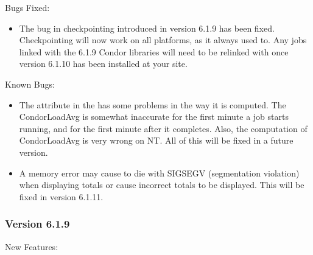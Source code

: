 \noindent Bugs Fixed:

\begin{itemize}

\item The bug in checkpointing introduced in version 6.1.9 has been
fixed.
Checkpointing will now work on all platforms, as it always used to.  
Any jobs linked with the 6.1.9 Condor libraries will need to be
relinked with  once version 6.1.10 has been installed
at your site. 

\end{itemize}

\noindent Known Bugs:

\begin{itemize}

\item The  attribute in the  has
some problems in the way it is computed.
The CondorLoadAvg is somewhat inaccurate for the first minute a job
starts running, and for the first minute after it completes.
Also, the computation of CondorLoadAvg is very wrong on NT.
All of this will be fixed in a future version.

\item A memory error may cause  to die with SIGSEGV
(segmentation violation) when displaying totals or cause incorrect
totals to be displayed.  This will be fixed in version 6.1.11.

\end{itemize}


\subsubsection{\label{sec:New-6-1-9}Version 6.1.9}

\noindent New Features:

